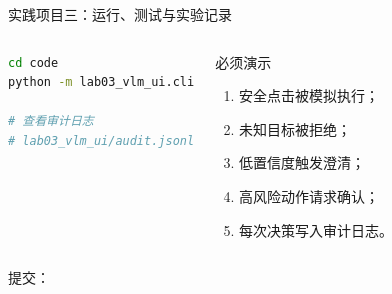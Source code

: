 \begin{frame}[fragile]{实践项目三：运行、测试与实验记录}
  \begin{columns}[T,onlytextwidth]
\begin{lstlisting}[language=bash]
cd code
python -m lab03_vlm_ui.cli

# 查看审计日志
# lab03_vlm_ui/audit.jsonl
\end{lstlisting}
      \begin{block}{必须演示}
        \begin{enumerate}
          \item 安全点击被模拟执行；
          \item 未知目标被拒绝；
          \item 低置信度触发澄清；
          \item 高风险动作请求确认；
          \item 每次决策写入审计日志。
        \end{enumerate}
      \end{block}
  \end{columns}
  \vspace{0.25em}
  \begin{center}
    提交：\quad
    \quad
    \quad
    \quad
  \end{center}
\end{frame}


